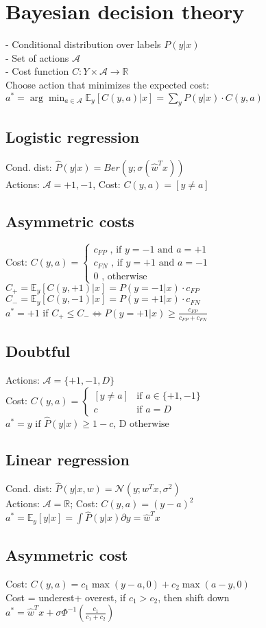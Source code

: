 \section*{\normalsize{Bayesian decision theory}}
- Conditional distribution over labels $P(y|x)$\\
- Set of actions $\mathcal{A}$\\
- Cost function $C:Y\times \mathcal{A} \rightarrow \mathbb{R}$\\
Choose action that minimizes the expected cost:\\
$a^* = \arg\min_{a \in \mathcal{A}} \mathbb{E}_y[C(y,a)|x] = \sum_y P(y|x) \cdot C(y,a)$
\subsection*{Logistic regression} 
Cond. dist: $\hat{P}(y|x) = Ber(y;\sigma(\hat{w}^Tx))$\\
Actions: $\mathcal{A} = {+1,-1}$, Cost: $C(y,a)=[y\neq a] $

\subsection*{Asymmetric costs}
Cost: $C(y,a) =
\begin{cases}
	 	c_{FP} \text{ , if } y=-1 \text{ and } a=+1\\
			c_{FN} \text{ , if } y=+1 \text{ and } a=-1\\
			0 \text{ , otherwise}
	 \end{cases}
$\\
$C_+ = \mathbb{E}_y[C(y,+1)|x] = P(y=-1|x) \cdot c_{FP}$\\
$C_- = \mathbb{E}_y[C(y,-1)|x] = P(y=+1|x) \cdot c_{FN} $\\
$a^* = +1$ if $C_+ \leq C_- \Leftrightarrow P(y=+1|x) \geq \frac{c_{FP}}{c_{FP} + c_{FN}}$

\subsection*{Doubtful}
Actions: $\mathcal{A} = \{ +1, -1, D\}$\\
Cost: $C(y,a) = \begin{cases}
			[y \neq a] &\text{if } a \in \{+1,-1\}\\
			c &\text{if } a = D
       \end{cases}$\\
$a^* = y \text{ if } \hat{P}(y|x) \geq 1-c\text{, D otherwise}$

\subsection*{Linear regression}
Cond. dist: $\hat{P}(y|x,w) = \mathcal{N}(y;w^Tx, \sigma^2)$\\
Actions: $\mathcal{A} = \mathbb{R}$; Cost: $C(y,a) = (y-a)^2$\\
$a^* = \mathbb{E}_y[y|x] = \int \hat{P}(y | x) \partial y = \hat{w}^Tx$

\subsection*{Asymmetric cost}
Cost: $C(y,a) = c_1 \max(y-a,0) + c_2 \max(a-y,0)$\\
Cost = underest+ overest, if $c_1 > c_2$, then shift down\\
$a^* = \hat{w}^Tx + \sigma \Phi^{-1} (\frac{c_1}{c_1 + c_2})$
